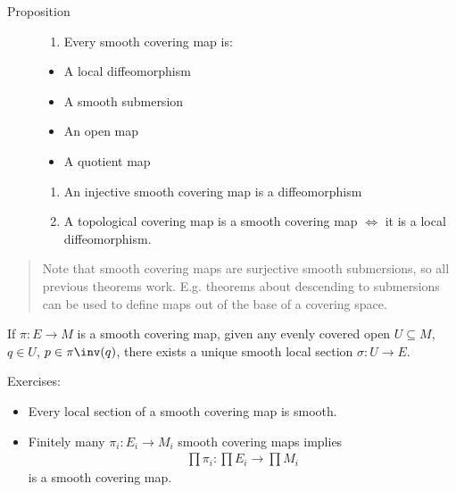 \begin{description}
\item[Proposition]
\hfill

\begin{enumerate}
\def\labelenumi{\arabic{enumi}.}
\tightlist
\item
  Every smooth covering map is:
\end{enumerate}

\begin{itemize}
\tightlist
\item
  A local diffeomorphism
\item
  A smooth submersion
\item
  An open map
\item
  A quotient map
\end{itemize}

\begin{enumerate}
\def\labelenumi{\arabic{enumi}.}
\setcounter{enumi}{1}
\item
  An injective smooth covering map is a diffeomorphism
\item
  A topological covering map is a smooth covering map \(\iff\) it is a
  local diffeomorphism.
\end{enumerate}
\end{description}

\begin{quote}
Note that smooth covering maps are surjective smooth submersions, so all
previous theorems work. E.g. theorems about descending to submersions
can be used to define maps out of the base of a covering space.
\end{quote}


\begin{description}
\tightlist
\item[Proposition (Strengthened Local Section Theorem for Covering
Maps)]
If \(\pi:E\to M\) is a smooth covering map, given any evenly covered
open \(U\subseteq M\), \(q\in U\), \(p\in \pi\inv(q)\), there exists a
unique smooth local section \(\sigma: U\to E\).
\end{description}

Exercises:

\begin{itemize}
\tightlist
\item
  Every local section of a smooth covering map is smooth.
\item
  Finitely many \(\pi_i: E_i \to M_i\) smooth covering maps implies
  \begin{align*}\prod \pi_i: \prod E_i \to \prod M_i\end{align*} is a
  smooth covering map.
\end{itemize}

